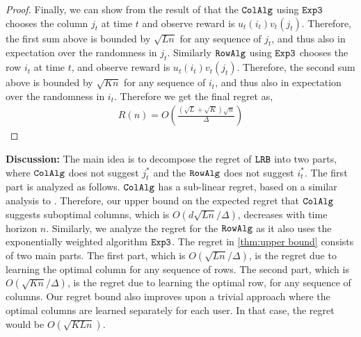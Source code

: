 \begin{proof}

Finally, we can show from the result of \citet{auer2002nonstochastic} that the ${\tt ColAlg}$ using ${\tt Exp3}$ chooses the column $j_t$ at time $t$ and observe reward is $u_t(i_t) v_t(j_t)$. Therefore, the first sum above is bounded by $\sqrt{L n}$ for any sequence of $j_t$, and thus also in expectation over the randomness in $j_t$. Similarly ${\tt RowAlg}$ using ${\tt Exp3}$ chooses the row $i_t$ at time $t$, and observe reward is $u_t(i_t) v_t(j_t)$. Therefore, the second sum above is bounded by $\sqrt{K n}$ for any sequence of $i_t$, and thus also in expectation over the randomness in $i_t$. Therefore we get the final regret as,
\begin{align*}
  R(n) = O\left(\frac{\left(\sqrt{L } + \sqrt{K }\right)\sqrt{n}}{\Delta}\right)
\end{align*}
\end{proof}





\textbf{Discussion:} The main idea is to decompose the regret of ${\tt LRB}$ into two parts, where ${\tt ColAlg}$ does not suggest $j^*_t$ and the ${\tt RowAlg}$ does not suggest $i^*_t$. The first part is analyzed as follows. ${\tt ColAlg}$ has a sub-linear regret, based on a similar analysis to \citet{auer2002nonstochastic}. Therefore, our upper bound on the expected regret that ${\tt ColAlg}$ suggests suboptimal columns, which is $O(d \sqrt{L n} / \Delta)$, decreases with time horizon $n$. Similarly, we analyze the regret for the ${\tt RowAlg}$ as it also uses the exponentially weighted algorithm ${\tt Exp3}$.
The regret in \cref{thm:upper bound} consists of two main parts. The first part, which is $O(\sqrt{L n} / \Delta)$, is the regret due to learning the optimal column for any sequence of rows. The second part, which is $O(\sqrt{K n} / \Delta)$, is the regret due to learning the optimal row, for any sequence of columns.
Our regret bound also improves upon a trivial approach where the optimal columns are learned separately for each user. In that case, the regret would be $O(\sqrt{K L n})$. 

